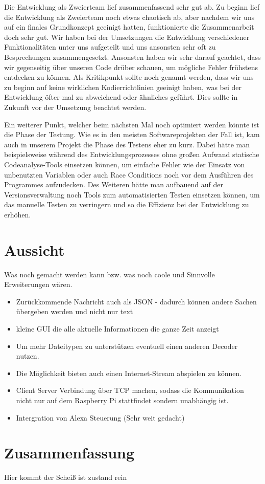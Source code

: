 Die Entwicklung als Zweierteam lief zusammenfassend sehr gut ab.
Zu beginn lief die Entwicklung als Zweierteam noch etwas chaotisch ab, aber
nachdem wir uns auf ein finales Grundkonzept geeinigt hatten, funktionierte die
Zusammenarbeit doch sehr gut. Wir haben bei der Umsetzungen die Entwicklung
verschiedener Funktionalitäten unter uns aufgeteilt und uns ansonsten sehr oft
zu Besprechungen zusammengesetzt. Ansonsten haben wir sehr darauf geachtet, dass
wir gegenseitig über unseren Code drüber schauen, um mögliche Fehler frühstens
entdecken zu können. Als Kritikpunkt sollte noch genannt werden, dass wir uns
zu beginn auf keine wirklichen Kodierrichtlinien geeinigt haben, was bei der
Entwicklung öfter mal zu abweichend  oder ähnliches
geführt. Dies sollte in Zukunft vor der Umsetzung beachtet werden. \newline

Ein weiterer Punkt, welcher beim nächsten Mal noch optimiert werden könnte ist
die Phase der Testung. Wie es in den meisten Softwareprojekten der Fall ist, %
kam auch in unserem Projekt die Phase des Testens eher zu kurz. Dabei hätte man
beispielsweise während des Entwicklungsprozesses ohne großen Aufwand statische
Codeanalyse-Tools einsetzen können, um einfache Fehler wie der Einsatz von
unbenutzten Variablen oder auch Race Conditions noch vor dem Ausführen des
Programmes aufzudecken. Des Weiteren hätte man aufbauend auf der
Versionsverwaltung noch Tools zum automatisierten Testen einsetzen können, um
das manuelle Testen zu verringern und so die Effizienz bei der Entwicklung zu
erhöhen.

\begin{comment}
- Codierrichtlinien
- Viel gelernt
- Go als Programmiersprache
- Kommunikation über Sockets zwischen zwei Programmen
- Analyse zu kurz
- Testung zu kurz
  - Countinous Integration
  - Static Code analysis
  - automatic testing with unit test
\end{comment}



\section{Aussicht}

Was noch gemacht werden kann bzw. was noch coole und Sinnvolle Erweiterungen wären.
\begin{itemize}
\item Zurückkommende Nachricht auch als JSON - dadurch können andere Sachen übergeben werden und nicht nur text
\item kleine GUI die alle aktuelle Informationen die ganze Zeit anzeigt
\item Um mehr Dateitypen zu unterstützen eventuell einen anderen Decoder nutzen.
\item Die Möglichkeit bieten auch einen Internet-Stream abspielen zu können.
\item Client Server Verbindung über TCP machen, sodass die Kommunikation nicht nur auf dem Raspberry Pi stattfindet sondern unabhängig ist.
\item Intergration von Alexa Steuerung (Sehr weit gedacht)
\end{itemize}

\section{Zusammenfassung}
Hier kommt der Scheiß ist zustand rein

